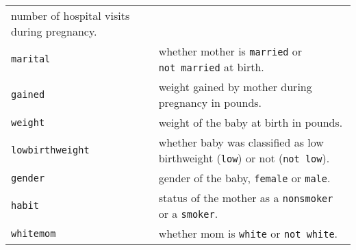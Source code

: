 \documentclass[]{article}
\begin{document}
\begin{longtable}[]{@{}ll@{}}
\begin{minipage}[t]{0.60\columnwidth}
number of hospital visits during pregnancy.\strut
\end{minipage}\tabularnewline
\begin{minipage}[t]{0.22\columnwidth}\raggedright\strut
\texttt{marital}\strut
\end{minipage} & \begin{minipage}[t]{0.60\columnwidth}\raggedright\strut
whether mother is \texttt{married} or \texttt{not\ married} at
birth.\strut
\end{minipage}\tabularnewline
\begin{minipage}[t]{0.22\columnwidth}\raggedright\strut
\texttt{gained}\strut
\end{minipage} & \begin{minipage}[t]{0.60\columnwidth}\raggedright\strut
weight gained by mother during pregnancy in pounds.\strut
\end{minipage}\tabularnewline
\begin{minipage}[t]{0.22\columnwidth}\raggedright\strut
\texttt{weight}\strut
\end{minipage} & \begin{minipage}[t]{0.60\columnwidth}\raggedright\strut
weight of the baby at birth in pounds.\strut
\end{minipage}\tabularnewline
\begin{minipage}[t]{0.22\columnwidth}\raggedright\strut
\texttt{lowbirthweight}\strut
\end{minipage} & \begin{minipage}[t]{0.60\columnwidth}\raggedright\strut
whether baby was classified as low birthweight (\texttt{low}) or not
(\texttt{not\ low}).\strut
\end{minipage}\tabularnewline
\begin{minipage}[t]{0.22\columnwidth}\raggedright\strut
\texttt{gender}\strut
\end{minipage} & \begin{minipage}[t]{0.60\columnwidth}\raggedright\strut
gender of the baby, \texttt{female} or \texttt{male}.\strut
\end{minipage}\tabularnewline
\begin{minipage}[t]{0.22\columnwidth}\raggedright\strut
\texttt{habit}\strut
\end{minipage} & \begin{minipage}[t]{0.60\columnwidth}\raggedright\strut
status of the mother as a \texttt{nonsmoker} or a \texttt{smoker}.\strut
\end{minipage}\tabularnewline
\begin{minipage}[t]{0.22\columnwidth}\raggedright\strut
\texttt{whitemom}\strut
\end{minipage} & \begin{minipage}[t]{0.60\columnwidth}\raggedright\strut
whether mom is \texttt{white} or \texttt{not\ white}.\strut
\end{minipage}\tabularnewline
\bottomrule
\end{longtable}
\end{document}
